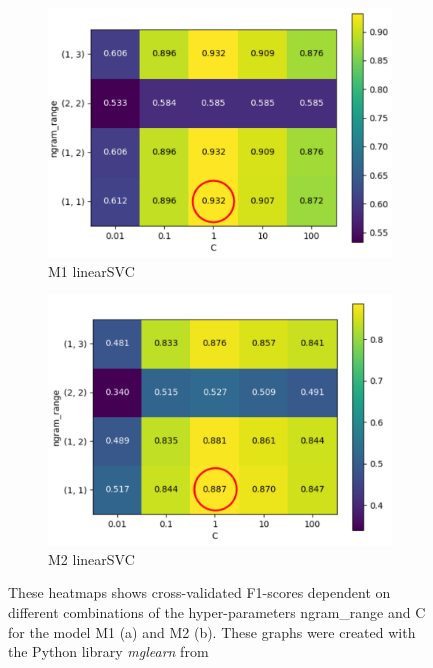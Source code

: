 \begin{figure}[h!]
 \begin{subfigure}{0.5\textwidth}
   \centering
   \includegraphics[width=0.9\linewidth]{img/m1_F1_ngram_C_heatmap_w_Circle.pdf}
   \caption{M1 linearSVC}
   \label{fig:m1_heatmap}
\end{subfigure}
\begin{subfigure}{0.5\textwidth}
   \centering
   \includegraphics[width=0.9\linewidth]{img/m2_ngram_C_heatmap_new_w_circle.pdf}
   \caption{M2 linearSVC}
   \label{fig:m2_heatmap}
 \end{subfigure}
\caption{These heatmaps shows cross-validated F1-scores dependent on different combinations of the hyper-parameters ngram\_range and C for the model M1 (a) and M2 (b). These graphs were created with the Python library \textit{mglearn} from \parencite{Guido2016}}
\label{fig:heatmaps}
\end{figure}

